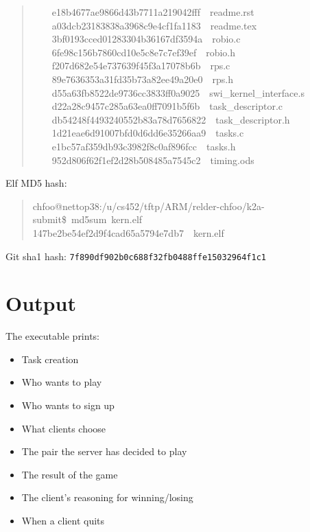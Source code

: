 \documentclass[letterpaper]{article}
\begin{document}
\begin{quote}
{~~~~e18b4677ae9866d43b7711a219042fff~~readme.rst\\
~~~~a03dcb23183838a3968c9e4cf1fa1183~~readme.tex\\
~~~~3bf0193cced01283304b36167df3594a~~robio.c\\
~~~~6fe98c156b7860cd10e5c8e7c7ef39ef~~robio.h\\
~~~~f207d682e54e737639f45f3a17078b6b~~rps.c\\
~~~~89e7636353a31fd35b73a82ee49a20e0~~rps.h\\
~~~~d55a63fb8522de9736cc3833ff0a9025~~swi\_kernel\_interface.s\\
~~~~d22a28c9457c285a63ea0ff7091b5f6b~~task\_descriptor.c\\
~~~~db54248f4493240552b83a78d7656822~~task\_descriptor.h\\
~~~~1d21eae6d91007bfd0d6dd6e35266aa9~~tasks.c\\
~~~~e1bc57af359db93c3982f8c0af896fcc~~tasks.h\\
~~~~952d806f62f1ef2d28b508485a7545c2~~timing.ods
}
\end{quote}

Elf MD5 hash:
%
\begin{quote}{\ttfamily \raggedright \noindent
chfoo@nettop38:/u/cs452/tftp/ARM/relder-chfoo/k2a-submit\$~md5sum~kern.elf\\
147be2be54ef2d9f4cad65a5794e7db7~~kern.elf
}
\end{quote}

Git sha1 hash: \texttt{7f890df902b0c688f32fb0488ffe15032964f1c1}


\section{Output%
  \label{output}%
}

The executable prints:
%
\begin{itemize}

\item Task creation

\item Who wants to play

\item Who wants to sign up

\item What clients choose

\item The pair the server has decided to play

\item The result of the game

\item The client's reasoning for winning/losing

\item When a client quits

\end{itemize}
\end{document}
